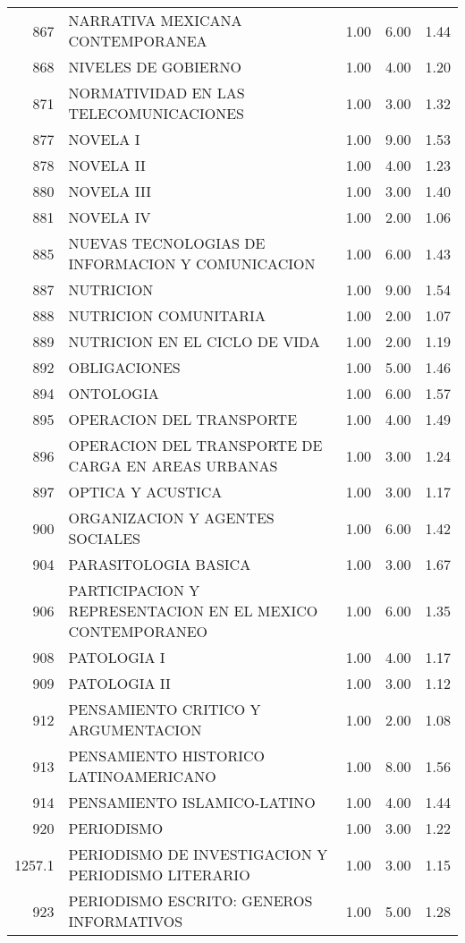 \begin{table}[ht]
\begin{tabular}{rlrrr}
  867 & NARRATIVA MEXICANA CONTEMPORANEA & 1.00 & 6.00 & 1.44 \\ 
  868 & NIVELES DE GOBIERNO & 1.00 & 4.00 & 1.20 \\ 
  871 & NORMATIVIDAD EN LAS TELECOMUNICACIONES & 1.00 & 3.00 & 1.32 \\ 
  877 & NOVELA I & 1.00 & 9.00 & 1.53 \\ 
  878 & NOVELA II & 1.00 & 4.00 & 1.23 \\ 
  880 & NOVELA III & 1.00 & 3.00 & 1.40 \\ 
  881 & NOVELA IV & 1.00 & 2.00 & 1.06 \\ 
  885 & NUEVAS TECNOLOGIAS DE INFORMACION Y COMUNICACION & 1.00 & 6.00 & 1.43 \\ 
  887 & NUTRICION & 1.00 & 9.00 & 1.54 \\ 
  888 & NUTRICION COMUNITARIA & 1.00 & 2.00 & 1.07 \\ 
  889 & NUTRICION EN EL CICLO DE VIDA & 1.00 & 2.00 & 1.19 \\ 
  892 & OBLIGACIONES & 1.00 & 5.00 & 1.46 \\ 
  894 & ONTOLOGIA & 1.00 & 6.00 & 1.57 \\ 
  895 & OPERACION DEL TRANSPORTE & 1.00 & 4.00 & 1.49 \\ 
  896 & OPERACION DEL TRANSPORTE DE CARGA EN AREAS URBANAS & 1.00 & 3.00 & 1.24 \\ 
  897 & OPTICA Y ACUSTICA & 1.00 & 3.00 & 1.17 \\ 
  900 & ORGANIZACION Y AGENTES SOCIALES & 1.00 & 6.00 & 1.42 \\ 
  904 & PARASITOLOGIA BASICA & 1.00 & 3.00 & 1.67 \\ 
  906 & PARTICIPACION Y REPRESENTACION EN EL MEXICO CONTEMPORANEO & 1.00 & 6.00 & 1.35 \\ 
  908 & PATOLOGIA I & 1.00 & 4.00 & 1.17 \\ 
  909 & PATOLOGIA II & 1.00 & 3.00 & 1.12 \\ 
  912 & PENSAMIENTO CRITICO Y ARGUMENTACION & 1.00 & 2.00 & 1.08 \\ 
  913 & PENSAMIENTO HISTORICO LATINOAMERICANO & 1.00 & 8.00 & 1.56 \\ 
  914 & PENSAMIENTO ISLAMICO-LATINO & 1.00 & 4.00 & 1.44 \\ 
  920 & PERIODISMO & 1.00 & 3.00 & 1.22 \\ 
  1257.1 & PERIODISMO DE INVESTIGACION Y PERIODISMO LITERARIO & 1.00 & 3.00 & 1.15 \\ 
  923 & PERIODISMO ESCRITO: GENEROS INFORMATIVOS & 1.00 & 5.00 & 1.28 \\ 

\end{tabular}
\end{table}
